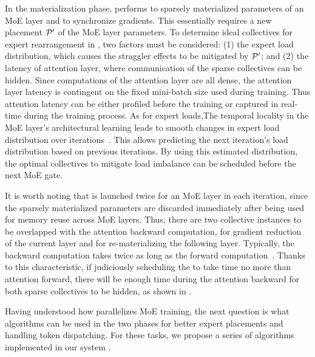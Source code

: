 In the materialization phase, \yyy performs  to sparsely materialized parameters of an MoE layer and  to synchronize gradients. This essentially requires a new placement $\mathcal{P}'$ of the MoE layer parameters.
To determine ideal collectives for expert rearrangement in \yyy, two factors must be considered: (1) the expert load distribution, which causes the straggler effects to be mitigated by $\mathcal{P}'$; and (2) the latency of attention layer, where communication of the sparse collectives can be hidden.
Since computations of the attention layer are all dense, the attention layer latency is contingent on the fixed mini-batch size used during training. Thus attention latency can be either profiled before the training or captured in real-time during the training process.
As for expert loads,The temporal locality in the MoE layer's architectural learning leads to smooth changes in expert load distribution over iterations~\cite{nie2023flexmoe}. This allows predicting the next iteration's load distribution based on previous iterations. By using this estimated distribution, the optimal collectives to mitigate load imbalance can be scheduled before the next MoE gate.

It is worth noting that \collsag is launched twice for an MoE layer in each iteration, since the sparsely materialized parameters are discarded immediately after being used for memory reuse across MoE layers. Thus, there are two collective instances to be overlapped with the attention backward computation, \ie \collsrs for gradient reduction of the current layer and \collsag for re-materializing the following layer. Typically, the backward computation takes twice as long as the forward computation~\cite{lecun1988theoretical}.
Thanks to this characteristic, if judiciously scheduling the \collsag to take time no more than attention forward, there will be enough time during the attention backward for both sparse collectives to be hidden, as shown in .

Having understood how \yyy parallelizes MoE training, the next question is what algorithms can be used in the two phases for better expert placements and handling token dispatching. For these tasks, we propose a series of algorithms implemented in our system \xxx.
